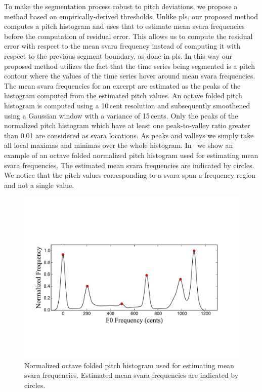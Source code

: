 {To make the segmentation process robust to pitch deviations, we propose a method based on empirically-derived thresholds. Unlike \gls{pls}, our proposed method computes a pitch histogram and uses that to estimate mean \gls{svara} frequencies before the computation of residual error. This allows us to compute the residual error with respect to the mean \gls{svara} frequency instead of computing it with respect to the previous segment boundary, as done in \gls{pls}.  In this way our proposed method utilizes the fact that the time series being segmented is a pitch contour where the values of the time series hover around mean \gls{svara} frequencies. The mean \gls{svara} frequencies for an excerpt are estimated as the peaks of the histogram computed from the estimated pitch values. An octave folded pitch histogram is computed using a 10\,cent resolution and subsequently smoothened using a Gaussian window with a variance of 15\,cents. Only the peaks of the normalized pitch histogram which have at least one peak-to-valley ratio greater than 0.01 are considered as \gls{svara} locations. As peaks and valleys we simply take all local maximas and minimas over the whole histogram. In~ we show an example of an octave folded normalized  pitch histogram used for estimating mean \gls{svara} frequencies. The estimated mean \gls{svara} frequencies are indicated by circles. We notice that the pitch values corresponding to a \gls{svara} span a frequency region and not a single value.


\begin{figure}
	\begin{center}
		\includegraphics[width=\figSizeNinety]{ch05_preprocessing/figures/swarOnHistogramForNyasSegmentation.pdf}
	\end{center}
	\caption{Normalized octave folded pitch histogram used for estimating mean \gls{svara} frequencies. Estimated mean \gls{svara} frequencies are indicated by circles.}
	\label{fig:pitch_histogram_nyas_segmentation}
\end{figure}

}

